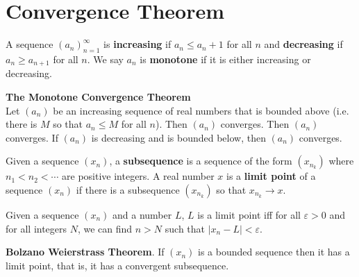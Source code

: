 \documentclass{article}
\begin{document}
\section{Convergence Theorem}
\begin{definition}
	A sequence $(a_n)^\infty_{n=1}$ is \textbf{increasing} if $a_n\leq a_n+1$ for all $n$ and \textbf{decreasing} if $a_n\geq a_{n+1}$ for all $n$. We say $a_n$ is \textbf{monotone} if it is either increasing or decreasing.
\end{definition}
\begin{theorem}
	\textbf{The Monotone Convergence Theorem}\\
	Let $(a_n)$ be an increasing sequence of real numbers that is bounded above (i.e. there is $M$ so that $a_n\leq M$ for all $n$). Then $(a_n)$ converges. Then $(a_n)$ converges. If $(a_n)$ is decreasing and is bounded below, then $(a_n)$ converges.
\end{theorem}
\begin{definition}
	Given a sequence $(x_n)$, a \textbf{subsequence} is a sequence of the form $(x_{n_k})$ where $n_1<n_2<\cdots$ are positive integers.
	A real number $x$ is a \textbf{limit point} of a sequence $(x_n)$ if there is a subsequence $(x_{n_k})$ so that $x_{n_k}\to x$.
\end{definition}
\begin{theorem}
	Given a sequence $(x_n)$ and a number $L$, $L$ is a limit point iff for all $\varepsilon > 0$ and for all integers $N$, we can find $n>N$ such that $|x_n-L|<\varepsilon$.
\end{theorem}
\begin{theorem}
	\textbf{Bolzano Weierstrass Theorem}. If $(x_n)$ is a bounded sequence then it has a limit point, that is, it has a convergent subsequence.
\end{theorem}
\end{document}
